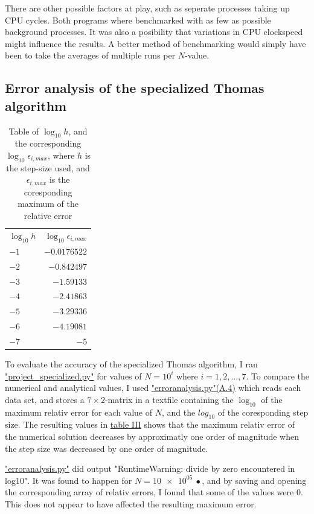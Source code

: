 \documentclass[english,notitlepage,reprint]{revtex4-1}  %
\begin{document}
There are other possible factors at play, such as seperate processes taking up CPU cycles. Both programs where benchmarked with as few as possible background processes. It was also a posibility that variations in CPU clockspeed might influence the results. A better method of benchmarking would simply have been to take the averages of multiple runs per \(N\)-value.
 
\subsection{Error analysis of the specialized Thomas algorithm}\label{subsec:43}
\begin{table}[H]
	\centering
	\label{tab:431}
	\begin{tabular}{l|r}
	\(\log_{10}h\) & \(\log_{10}\epsilon_{i,max}\) \\
	\(-1\) & \(-0.0176522\) \\
	\(-2\) & \(-0.842497\) \\
	\(-3\) & \(-1.59133\) \\
	\(-4\) & \(-2.41863\) \\
	\(-5\) & \(-3.29336\) \\
	\(-6\) & \(-4.19081\) \\
	\(-7\) & \(-5\) \\
	\end{tabular}
	\caption{Table of \(\log_{10}h\), and the corresponding \(\log_{10}\epsilon_{i,max}\),
	where \(h\) is the step-size used, and \(\epsilon_{i,max}\) is the coresponding
	maximum of the relative error}
\end{table}

To evaluate the accuracy of the specialized Thomas algorithm, I ran \hyperref[A:2]{"project\_specialized.py"} for values of \(N=10^{i}\) where \(i=1,2,...,7\). To compare the numerical and analytical values, I used \hyperref[A:4]{"erroranalysis.py"(A.4)} which reads each data set, and stores a \(7\times 2\)-matrix in a textfile containing the \(\log_{10}\) of the maximum relativ error for each value of \(N\), and the \(log_{10}\) of the coresponding step size. The resulting values in \hyperref[tab:431]{table III} shows that the maximum relativ error of the numerical solution decreases by approximatly one order of magnitude when the step size was decreased by one order of magnitude.

\hyperref[A:4]{"erroranalysis.py"} did output "RuntimeWarning: divide by zero encountered in log10". It was found to happen for \(N=\SI{10e+05}{•}\), and by saving and opening the corresponding array of relativ errors, I found that some of the values were \(0\). This does not appear to have affected the resulting maximum error.
\end{document}
